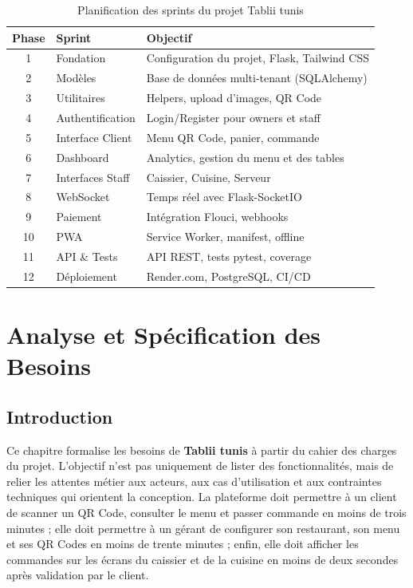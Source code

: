 \documentclass[12pt,a4paper]{report}
\begin{document}
\begin{table}[H]
    \centering
    \begin{tabularx}{\textwidth}{c l X}
        \toprule
        \rowcolor{primary!10}
        \textbf{Phase} & \textbf{Sprint} & \textbf{Objectif} \\
        \midrule
        1 & Fondation & Configuration du projet, Flask, Tailwind CSS \\
        2 & Modèles & Base de données multi-tenant (SQLAlchemy) \\
        3 & Utilitaires & Helpers, upload d'images, QR Code \\
        4 & Authentification & Login/Register pour owners et staff \\
        5 & Interface Client & Menu QR Code, panier, commande \\
        6 & Dashboard & Analytics, gestion du menu et des tables \\
        7 & Interfaces Staff & Caissier, Cuisine, Serveur \\
        8 & WebSocket & Temps réel avec Flask-SocketIO \\
        9 & Paiement & Intégration Flouci, webhooks \\
        10 & PWA & Service Worker, manifest, offline \\
        11 & API \& Tests & API REST, tests pytest, coverage \\
        12 & Déploiement & Render.com, PostgreSQL, CI/CD \\
        \bottomrule
    \end{tabularx}
    \caption{Planification des sprints du projet Tablii tunis}
    \label{tab:sprints}
\end{table}

\cleardoublepage
\chapter{Analyse et Spécification des Besoins}

\section{Introduction}

Ce chapitre formalise les besoins de \textbf{Tablii tunis} à partir du cahier des charges du projet. L'objectif n'est pas uniquement de lister des fonctionnalités, mais de relier les attentes métier aux acteurs, aux cas d'utilisation et aux contraintes techniques qui orientent la conception. La plateforme doit permettre à un client de scanner un QR Code, consulter le menu et passer commande en moins de trois minutes ; elle doit permettre à un gérant de configurer son restaurant, son menu et ses QR Codes en moins de trente minutes ; enfin, elle doit afficher les commandes sur les écrans du caissier et de la cuisine en moins de deux secondes après validation par le client.
\end{document}
